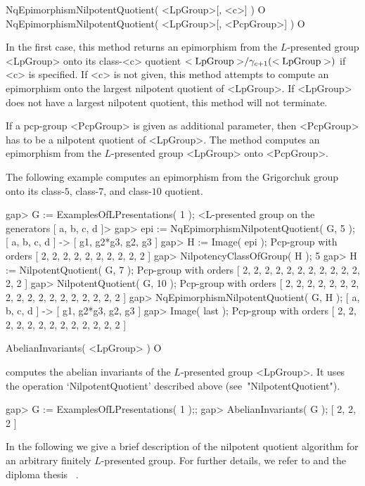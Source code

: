 \> NqEpimorphismNilpotentQuotient( <LpGroup>[, <c>] ) O
\> NqEpimorphismNilpotentQuotient( <LpGroup>[, <PcpGroup>] ) O

In the first case, this method returns an epimorphism from the
$L$-presented group <LpGroup> onto its class-<c> quotient ${\rm
<LpGroup>}/\gamma_{c+1}({\rm <LpGroup>})$ if <c> is specified. If <c>
is not given, this method attempts to compute an epimorphism onto the
largest nilpotent quotient of <LpGroup>. If <LpGroup> does not have a
largest nilpotent quotient, this method will not terminate.

If a pcp-group <PcpGroup> is given as additional parameter, then
<PcpGroup> has to be a nilpotent quotient of <LpGroup>. The method
computes an epimorphism from the $L$-presented group <LpGroup> onto
<PcpGroup>.

The following example computes an epimorphism from the Grigorchuk group
onto its class-$5$, class-$7$, and class-$10$ quotient.

\beginexample
gap> G := ExamplesOfLPresentations( 1 );
<L-presented group on the generators [ a, b, c, d ]>
gap> epi := NqEpimorphismNilpotentQuotient( G, 5 );
[ a, b, c, d ] -> [ g1, g2*g3, g2, g3 ]
gap> H := Image( epi );
Pcp-group with orders [ 2, 2, 2, 2, 2, 2, 2, 2, 2, 2 ]
gap> NilpotencyClassOfGroup( H );
5
gap> H := NilpotentQuotient( G, 7 );
Pcp-group with orders [ 2, 2, 2, 2, 2, 2, 2, 2, 2, 2, 2, 2, 2 ]
gap> NilpotentQuotient( G, 10 );
Pcp-group with orders [ 2, 2, 2, 2, 2, 2, 2, 2, 2, 2, 2, 2, 2, 2, 2, 2, 2, 2 ]
gap> NqEpimorphismNilpotentQuotient( G, H );
[ a, b, c, d ] -> [ g1, g2*g3, g2, g3 ]
gap> Image( last );
Pcp-group with orders [ 2, 2, 2, 2, 2, 2, 2, 2, 2, 2, 2, 2, 2 ]
\endexample

\> AbelianInvariants( <LpGroup> ) O

computes the abelian invariants of the $L$-presented group
<LpGroup>. It uses the operation `NilpotentQuotient' described above
(see~"NilpotentQuotient").

\beginexample
gap> G := ExamplesOfLPresentations( 1 );;
gap> AbelianInvariants( G );
[ 2, 2, 2 ]
\endexample


In the following we give a brief description of the nilpotent quotient
algorithm for an arbitrary finitely $L$-presented group. For further
details, we refer to \cite{BEH08} and the diploma thesis~\cite{H08} .

